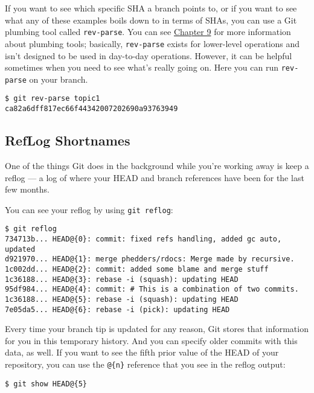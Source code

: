 \documentclass[a4paper]{book}
\newcommand{\prechap}{Chapter }
\newcommand{\postchap}{}
\newcommand{\chapref}[1]{\hyperref[chap:#1]{\prechap #1\postchap}}
\begin{document}
If you want to see which specific SHA a branch points to, or if you want to see what any of these examples boils down to in terms of SHAs, you can use a Git plumbing tool called \texttt{rev-parse}. You can see \chapref{9} for more information about plumbing tools; basically, \texttt{rev-parse} exists for lower-level operations and isn't designed to be used in day-to-day operations. However, it can be helpful sometimes when you need to see what's really going on. Here you can run \texttt{rev-parse} on your branch.

\begin{shaded}\begin{verbatim}
$ git rev-parse topic1
ca82a6dff817ec66f44342007202690a93763949
\end{verbatim}\end{shaded}

\subsection{RefLog Shortnames}

One of the things Git does in the background while you're working away is keep a reflog --- a log of where your HEAD and branch references have been for the last few months.

You can see your reflog by using \texttt{git reflog}:

\begin{shaded}\begin{verbatim}
$ git reflog
734713b... HEAD@{0}: commit: fixed refs handling, added gc auto, updated
d921970... HEAD@{1}: merge phedders/rdocs: Merge made by recursive.
1c002dd... HEAD@{2}: commit: added some blame and merge stuff
1c36188... HEAD@{3}: rebase -i (squash): updating HEAD
95df984... HEAD@{4}: commit: # This is a combination of two commits.
1c36188... HEAD@{5}: rebase -i (squash): updating HEAD
7e05da5... HEAD@{6}: rebase -i (pick): updating HEAD
\end{verbatim}\end{shaded}

Every time your branch tip is updated for any reason, Git stores that information for you in this temporary history. And you can specify older commits with this data, as well. If you want to see the fifth prior value of the HEAD of your repository, you can use the \texttt{@\{n\}} reference that you see in the reflog output:

\begin{shaded}\begin{verbatim}
$ git show HEAD@{5}
\end{verbatim}\end{shaded}
\end{document}
